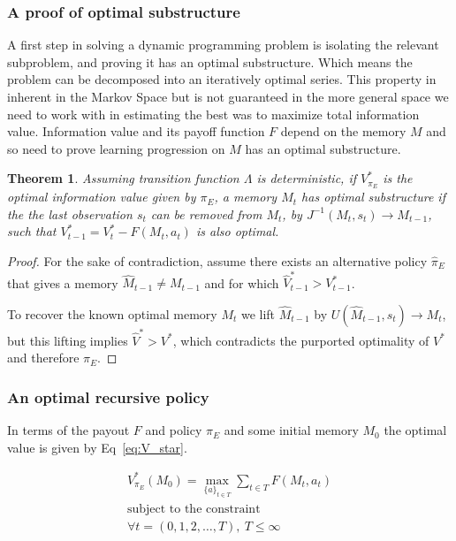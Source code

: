 \documentclass[9pt,twocolumn,twoside]{pnas-new}
\newtheorem{theorem}{Theorem}
\begin{document}
\subsubsection*{A proof of optimal substructure}
A first step in solving a dynamic programming problem is isolating the relevant subproblem, and proving it has an optimal substructure. Which means the problem can be decomposed into an iteratively optimal series. This property in inherent in the Markov Space %
but is not guaranteed in the more general space we need to work with in estimating the best was to maximize total information value. Information value and its payoff function $F$ depend on the memory $M$ and so need to prove learning progression on $M$ has an optimal substructure.

\begin{theorem} \label{theorem:opt_sub}
    Assuming transition function $\Lambda$ is deterministic, if $V^*_{\pi_E}$ is the optimal information value given by $\pi_E$, a memory $M_t$ has optimal substructure if the the last observation $s_t$ can be removed from $M_t$, by $J^{-1}(M_t, s_t) \rightarrow M_{t-1}$, such that $V^*_{t-1} = V^*_t - F(M_t, a_t)$ is also optimal. 
\end{theorem}
\begin{proof}
    For the sake of contradiction, assume there exists an alternative policy $\hat \pi_E$ that gives a memory $\hat M_{t-1} \neq M_{t-1}$ and for which $\hat V^*_{t-1} > V^*_{t-1}$. 

    To recover the known optimal memory $M_t$ we lift $\hat M_{t-1}$ by $U(\hat M_{t-1}, s_t) \rightarrow M_t$, but this lifting implies $\hat V^* > V^*$, which contradicts the purported optimality of $V^*$ and therefore $\pi_E$.
\end{proof}


\subsubsection*{An optimal recursive policy}
In terms of the payout $F$ and policy $\pi_E$ and some initial memory $M_0$ the optimal value is given by Eq~\ref{eq:V_star}.

\begin{equation} \label{eq:V_star}
    \begin{split}
        V^*_{\pi_E}(M_0) = \max_{\{a\}_{t \in T}} \sum_{t \in T} F(M_t, a_t)\\
        \text{subject to the constraint}\\
        \forall t = (0,1,2,\ldots, T),\ T \leq \infty
    \end{split}
\end{equation}
\end{document}
